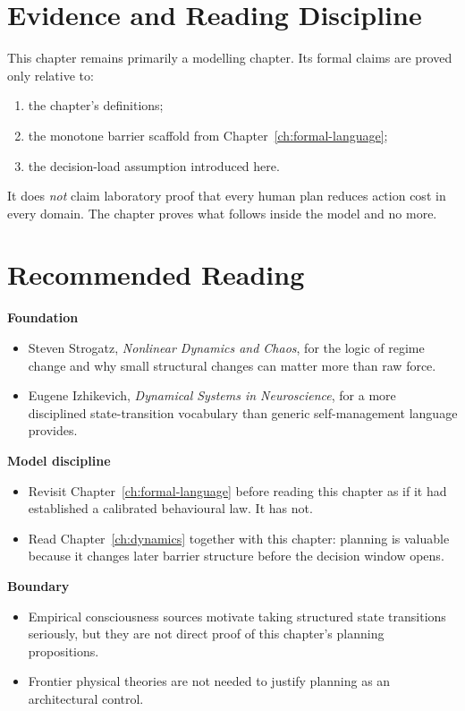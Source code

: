 \section{Evidence and Reading Discipline}

This chapter remains primarily a modelling chapter. Its formal claims are
proved only relative to:
\begin{enumerate}[nosep]
  \item the chapter's definitions;
  \item the monotone barrier scaffold from Chapter~\ref{ch:formal-language};
  \item the decision-load assumption introduced here.
\end{enumerate}

It does \emph{not} claim laboratory proof that every human plan reduces action
cost in every domain. The chapter proves what follows inside the model and no
more.

\section{Recommended Reading}

\begin{readingbox}
\textbf{Foundation}
\begin{itemize}[nosep]
  \item Steven Strogatz, \emph{Nonlinear Dynamics and Chaos}, for the logic of
        regime change and why small structural changes can matter more than raw
        force.
  \item Eugene Izhikevich, \emph{Dynamical Systems in Neuroscience}, for a more
        disciplined state-transition vocabulary than generic self-management
        language provides.
\end{itemize}
\textbf{Model discipline}
\begin{itemize}[nosep]
  \item Revisit Chapter~\ref{ch:formal-language} before reading this chapter as
        if it had established a calibrated behavioural law. It has not.
  \item Read Chapter~\ref{ch:dynamics} together with this chapter: planning is
        valuable because it changes later barrier structure before the decision
        window opens.
\end{itemize}
\textbf{Boundary}
\begin{itemize}[nosep]
  \item Empirical consciousness sources motivate taking structured state
        transitions seriously, but they are not direct proof of this chapter's
        planning propositions.
  \item Frontier physical theories are not needed to justify planning as an
        architectural control.
\end{itemize}
\end{readingbox}

